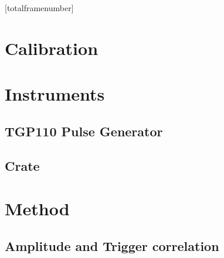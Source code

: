 \documentclass[9pt]{beamer}
\begin{document}
	[totalframenumber] 
	\frame{\titlepage}

	

	\section{Calibration}
		
		

	\section{Instruments}
		\subsection{TGP110 Pulse Generator}
			
		\subsection{Crate}
			
		
	
	\section{Method}
		\subsection{Amplitude and Trigger correlation}
			
			

\end{document}
